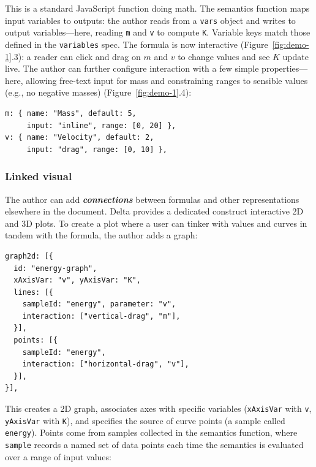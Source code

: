 This is a standard JavaScript function doing math. The semantics function maps input variables to outputs: the author reads from a \texttt{vars} object and writes to output variables---here, reading \texttt{m} and \texttt{v} to compute \texttt{K}. Variable keys match those defined in the \texttt{variables} spec. The formula is now interactive (Figure~\ref{fig:demo-1}.3): a reader can click and drag on $m$ and $v$ to change values and see $K$ update live. The author can further configure interaction with a few simple properties---here, allowing free-text input for mass and constraining ranges to sensible values (e.g., no negative masses) (Figure~\ref{fig:demo-1}.4):

\begin{tcolorbox}[codebox]
\begin{lstlisting}[style=jsstyle]
m: { name: "Mass", default: 5, 
     input: "inline", range: [0, 20] },
v: { name: "Velocity", default: 2,
     input: "drag", range: [0, 10] },
\end{lstlisting}
\end{tcolorbox}

\subsubsection{Linked visual}
The author can add \textbf{\textit{connections}} between formulas and other representations elsewhere in the document. Delta provides a dedicated construct interactive 2D and 3D plots. To create a plot where a user can tinker with values and curves in tandem with the formula, the author adds a graph:

\begin{tcolorbox}[codebox]
\begin{lstlisting}[style=jsstyle]
graph2d: [{
  id: "energy-graph",
  xAxisVar: "v", yAxisVar: "K",
  lines: [{
    sampleId: "energy", parameter: "v",
    interaction: ["vertical-drag", "m"],
  }],
  points: [{
    sampleId: "energy",
    interaction: ["horizontal-drag", "v"],
  }],
}],
\end{lstlisting}
\end{tcolorbox}

This creates a 2D graph, associates axes with specific variables (\texttt{xAxisVar} with \texttt{v}, \texttt{yAxisVar} with \texttt{K}), and specifies the source of curve points (a sample called \texttt{energy}). Points come from samples collected in the semantics function, where \texttt{sample} records a named set of data points each time the semantics is evaluated over a range of input values:


